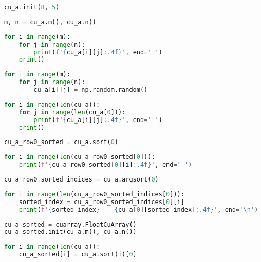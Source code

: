 \documentclass{article}
\begin{document}
    \begin{lstlisting}[language=Python]
cu_a.init(8, 5)
    \end{lstlisting}

    \begin{lstlisting}[language=Python]
m, n = cu_a.m(), cu_a.n()
    \end{lstlisting}

    \begin{lstlisting}[language=Python]
for i in range(m):
    for j in range(n):
        print(f'{cu_a[i][j]:.4f}', end=' ')
    print()
    \end{lstlisting}

    \begin{lstlisting}[language=Python]
for i in range(m):
    for j in range(n):
        cu_a[i][j] = np.random.random()
    \end{lstlisting}

    \begin{lstlisting}[language=Python]
for i in range(len(cu_a)):
    for j in range(len(cu_a[0])):
        print(f'{cu_a[i][j]:.4f}', end=' ')
    print()
    \end{lstlisting}

    \begin{lstlisting}[language=Python]
cu_a_row0_sorted = cu_a.sort(0)
    \end{lstlisting}

    \begin{lstlisting}[language=Python]
for i in range(len(cu_a_row0_sorted[0])):
    print(f'{cu_a_row0_sorted[0][i]:.4f}', end=' ')
    \end{lstlisting}

    \begin{lstlisting}[language=Python]
cu_a_row0_sorted_indices = cu_a.argsort(0)
    \end{lstlisting}

    \begin{lstlisting}[language=Python]
for i in range(len(cu_a_row0_sorted_indices[0])):
    sorted_index = cu_a_row0_sorted_indices[0][i]
    print(f'{sorted_index}    {cu_a[0][sorted_index]:.4f}', end='\n')
    \end{lstlisting}

    \begin{lstlisting}[language=Python]
cu_a_sorted = cuarray.FloatCuArray()
cu_a_sorted.init(cu_a.m(), cu_a.n())
    \end{lstlisting}

    \begin{lstlisting}[language=Python]
for i in range(len(cu_a)):
    cu_a_sorted[i] = cu_a.sort(i)[0]
    \end{lstlisting}
\end{document}
